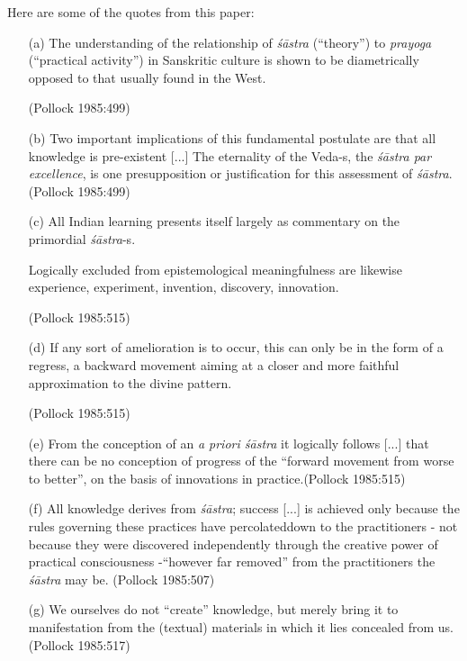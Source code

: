 Here are some of the quotes from this paper:
\begin{itemize}
\itemsep=1pt
\item[(a)] The understanding of the relationship of {\sl śāstra} (``theory'') to {\sl prayoga} (``practical activity'') in Sanskritic culture is shown to be diametrically opposed to that usually found in the West.

\hfill (Pollock 1985:499)

\item[(b)] Two important implications of this fundamental postulate are that all knowledge is pre-existent [...] The eternality of the Veda-s, the {\sl śāstra par excellence}, is one presupposition or justification for this assessment of {\sl śāstra}.\hfill (Pollock 1985:499)

\item[(c)] All Indian learning presents itself largely as commentary on the primordial {\sl śāstra}-s.

Logically excluded from epistemological meaningfulness are likewise experience, experiment, invention, discovery, innovation.

\hfill (Pollock 1985:515)

\item[(d)] If any sort of amelioration is to occur, this can only be in the form of a regress, a backward movement aiming at a closer and more faithful approximation to the divine pattern.

\hfill (Pollock 1985:515)

\item[(e)] From the conception of an {\sl a priori śāstra} it logically follows [...] that there can be no conception of progress of the ``forward movement from worse to better'', on the basis of innovations in practice.\hfill (Pollock 1985:515)

\item[(f)] All knowledge derives from {\sl śāstra}; success [...] is achieved only because the rules governing these practices have percolated\break down to the practitioners - not because they were discovered independently through the creative power of practical consciousness -``however far removed'' from the practitioners the {\sl śāstra} may be.
\hfill (Pollock 1985:507)

\item[(g)] We ourselves do not ``create'' knowledge, but merely bring it to manifestation from the (textual) materials in which it lies concealed from us.
\hfill (Pollock 1985:517) 
\end{itemize}

